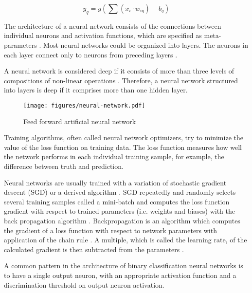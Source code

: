 \begin{equation}
  y_q = g\left(\sum(x_i \cdot w_{iq}) - b_q\right)
  \label{eq:intro:neuron-activation}
\end{equation}

The architecture of a neural network consists of the connections between
individual neurons and activation functions, which are specified as
meta-parameters \cite[p.~193]{goodfellow2016deep}. Most neural networks could
be organized into layers. The neurons in each layer connect only to neurons
from preceding layers \cite[p.~193]{goodfellow2016deep}.

A neural network is considered deep if it consists of more than three levels of
compositions of non-linear operations \cite[p.~6]{bengio2009learning}.
Therefore, a neural network structured into layers is deep if it comprises more
than one hidden layer.

\begin{figure}
  \centering
  \texttt{[image: figures/neural-network.pdf]}
  \caption{Feed forward artificial neural network \cite{feed-forward-img}}
  \label{fig:intro:neural-network}
\end{figure}

Training algorithms, often called neural network optimizers, try to minimize
the value of the loss function on training data. The loss function measures how
well the network performs in each individual training sample, for example, the
difference between truth and prediction.

Neural networks are usually trained with a variation of stochastic gradient
descent (SGD) or a derived algorithm \cite[p.~149]{goodfellow2016deep}. SGD
repeatedly and randomly selects several training samples called a mini-batch
and computes the loss function gradient with respect to trained parameters
(i.e. weights and biases) with the back propagation algorithm
\cite[p.~149]{goodfellow2016deep}. Backpropagation is an algorithm which
computes the gradient of a loss function with respect to network parameters
with application of the chain rule \cite[p.~201]{goodfellow2016deep}. A
multiple, which is called the learning rate, of the calculated gradient is then
subtracted from the parameters \cite[p.~150]{goodfellow2016deep}.

A common pattern in the architecture of binary classification neural networks
is to have a single output neuron, with an appropriate activation function and
a discrimination threshold on output neuron activation.

